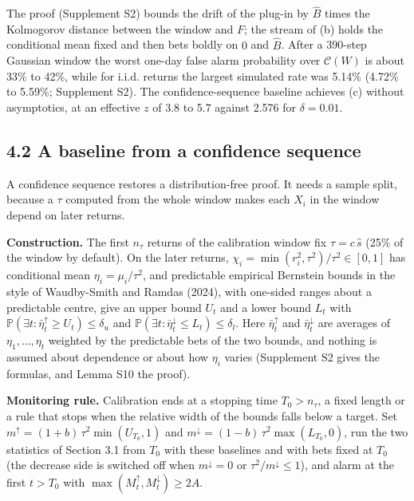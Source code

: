 \documentclass[
]{article}
\begin{document}
The proof (Supplement S2) bounds the drift of the plug-in by \(\hat B\)
times the Kolmogorov distance between the window and \(F\); the stream
of (b) holds the conditional mean fixed and then bets boldly on \(0\)
and \(\hat B\). After a 390-step Gaussian window the worst one-day false
alarm probability over \(\mathcal{C}(W)\) is about 33\% to 42\%, while
for i.i.d. returns the largest simulated rate was 5.14\% (4.72\% to
5.59\%; Supplement S2). The confidence-sequence baseline achieves (c)
without asymptotics, at an effective \(z\) of 3.8 to 5.7 against 2.576
for \(\delta = 0.01\).

\hypertarget{a-baseline-from-a-confidence-sequence}{%
\subsection{4.2 A baseline from a confidence
sequence}\label{a-baseline-from-a-confidence-sequence}}

A confidence sequence restores a distribution-free proof. It needs a
sample split, because a \(\tau\) computed from the whole window makes
each \(X_i\) in the window depend on later returns.

\textbf{Construction.} The first \(n_\tau\) returns of the calibration
window fix \(\tau = c\,\hat s\) (25\% of the window by default). On the
later returns, \(\chi_i = \min(r_i^2, \tau^2)/\tau^2 \in [0, 1]\) has
conditional mean \(\eta_i = \mu_i/\tau^2\), and predictable empirical
Bernstein bounds in the style of Waudby-Smith and Ramdas (2024), with
one-sided ranges about a predictable centre, give an upper bound \(U_t\)
and a lower bound \(L_t\) with
\(\mathbb{P}(\exists t: \bar\eta_t^{\uparrow} \ge U_t) \le \delta_u\)
and
\(\mathbb{P}(\exists t: \bar\eta_t^{\downarrow} \le L_t) \le \delta_l\).
Here \(\bar\eta_t^{\uparrow}\) and \(\bar\eta_t^{\downarrow}\) are
averages of \(\eta_1, \dots, \eta_t\) weighted by the predictable bets
of the two bounds, and nothing is assumed about dependence or about how
\(\eta_i\) varies (Supplement S2 gives the formulas, and Lemma S10 the
proof).

\textbf{Monitoring rule.} Calibration ends at a stopping time
\(T_0 > n_\tau\), a fixed length or a rule that stops when the relative
width of the bounds falls below a target. Set
\(m^{\uparrow} = (1+b)\,\tau^2 \min(U_{T_0}, 1)\) and
\(m^{\downarrow} = (1-b)\,\tau^2 \max(L_{T_0}, 0)\), run the two
statistics of Section 3.1 from \(T_0\) with these baselines and with
bets fixed at \(T_0\) (the decrease side is switched off when
\(m^{\downarrow} = 0\) or \(\tau^2/m^{\downarrow} \le 1\)), and alarm at
the first \(t > T_0\) with
\(\max(M_t^{\uparrow}, M_t^{\downarrow}) \ge 2A\).
\end{document}
